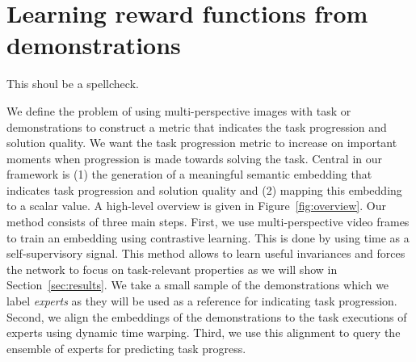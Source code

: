 \documentclass[\home/main.tex]{subfiles}
\begin{document}
\chapter{Learning reward functions from demonstrations}\label{ch:reward_functions}
This shoul be a spellcheck.

We define the problem of using multi-perspective images with task or demonstrations to construct a metric that indicates the task progression and solution quality. We want the task progression metric to increase on important moments when progression is made towards solving the task. Central in our framework is (1) the generation of a meaningful semantic embedding that indicates task progression and solution quality and (2) mapping this embedding to a scalar value. A high-level overview is given in Figure~\ref{fig:overview}. Our method consists of three main steps. First, we use multi-perspective video frames to train an embedding using contrastive learning. This is done by using time as a self-supervisory signal. This method allows to learn useful invariances and forces the network to focus on task-relevant properties as we will show in Section~\ref{sec:results}. We take a small sample of the demonstrations which we label \textit{experts} as they will be used as a reference for indicating task progression. Second, we align the embeddings of the demonstrations to the task executions of experts using dynamic time warping. Third, we use this alignment to query the ensemble of experts for predicting task progress.


\end{document}
